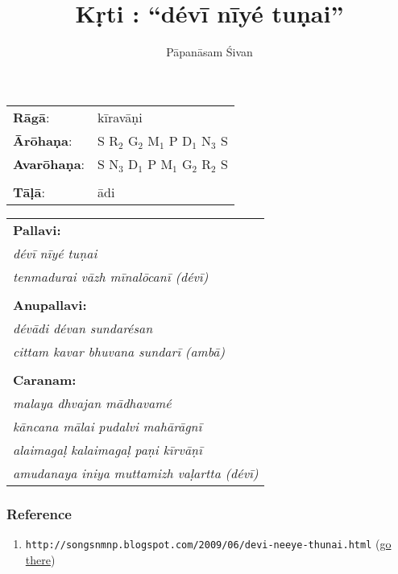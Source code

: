 \documentclass[12pt]{article}
\title{K\d rti : ``d\'ev\=i n\=iy\'e tu\d{n}ai''}
\author{P\=apan\=asam \'Sivan}
\def \info#1#2#3#4{%
	\begin{tabular}{ll}
	\textbf{R\=ag\=a}: & #1 \\
	\textbf{\=Ar\=oha\d na}: & #2 \\
	\textbf{Avar\=oha\d na}: & #3 \\\\
	\textbf{T\=a\d l\=a}: & #4
	\end{tabular}
	}
\def \netref#1{{\scriptsize {\tt #1} (\href{#1}{go there})}}
\begin{document}
\maketitle

\info{k\=irav\=a\d{n}i}{S R$_{2}$ G$_{2}$ M$_{1}$ P D$_{1}$ N$_{3}$ S}{S N$_{3}$ D$_{1}$ P M$_{1}$ G$_{2}$ R$_{2}$ S}{\=adi}

\vspace{0.25 in}

%
%
%
%
%


\begin{tabular}{l}
\textbf{Pallavi:}\\
\emph{d\'ev\=i n\=iy\'e tu\d{n}ai}\\
\emph{tenmadurai v\=azh m\=inal\=ocan\=i (d\'ev\=i)}\\
\\
\textbf{Anupallavi:}\\
\emph{d\'ev\=adi d\'evan sundar\'esan}\\
\emph{cittam kavar bhuvana sundar\=i (amb\=a)}\\
\\
\textbf{Caranam:}\\
\emph{malaya dhvajan m\=adhavam\'e}\\
\emph{k\=ancana m\=alai pudalvi mah\=ar\=agn\=i}\\
\emph{alaimaga\d{l} kalaimaga\d{l} pa\d{n}i k\=irv\=a\d{n}\=i}\\
\emph{amudanaya iniya muttamizh va\d{l}artta (d\'ev\=i)}
\end{tabular}

\subsubsection*{Reference}

\begin{enumerate}
\item \netref{http://songsnmnp.blogspot.com/2009/06/devi-neeye-thunai.html}
\end{enumerate}

\end{document}
